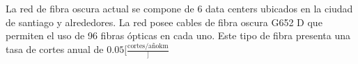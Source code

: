 La red de fibra oscura actual se compone de 6 data centers ubicados en la ciudad de santiago y alrededores. La red posee cables de fibra oscura G652 D que permiten el uso de 96 fibras ópticas en cada uno. Este tipo de fibra presenta una tasa de cortes anual de $0.05 [\frac{\text{cortes}/\text{año} \text{km}}]$